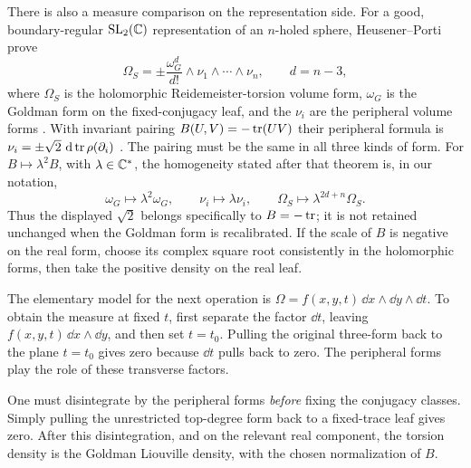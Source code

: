 There is also a measure comparison on the representation side.
For a good, boundary-regular $\mathrm{SL}_2(\mathbb C)$ representation
of an $n$-holed sphere, Heusener--Porti prove
\begin{equation}
 \Omega_S=\pm\frac{\omega_G^d}{d!}
                  \wedge\nu_1\wedge\cdots\wedge\nu_n,
                  \qquad d=n-3,
 \label{eq:torsionGoldman}
\end{equation}
where $\Omega_S$ is the holomorphic Reidemeister-torsion volume
form, $\omega_G$ is the Goldman form on the fixed-conjugacy
leaf, and the $\nu_i$ are the peripheral volume forms
\cite[Theorem~3]{HeusenerPorti}. With invariant pairing
$B(U,V)=-\operatorname{tr}(UV)$ their peripheral formula is
$\nu_i=\pm\sqrt2\,\mathop{}\!\mathrm d\operatorname{tr}\rho(\partial_i)$
\cite[Proposition~2]{HeusenerPorti}.
The pairing must be the same in all three kinds of form.
For $B\mapsto\lambda^2B$, with $\lambda\in\mathbb C^*$,
the homogeneity stated after that theorem is, in our notation,
\[
 \omega_G\mapsto\lambda^2\omega_G,\qquad
 \nu_i\mapsto\lambda\nu_i,\qquad
 \Omega_S\mapsto\lambda^{2d+n}\Omega_S.
\]
Thus the displayed $\sqrt2$ belongs specifically to $B=-\operatorname{tr}$;
it is not retained unchanged when the Goldman form is recalibrated.
If the scale of $B$ is negative on the real form, choose its
complex square root consistently in the holomorphic forms,
then take the positive density on the real leaf.

The elementary model for the next operation is
$\Omega=f(x,y,t)\,\dd x\wedge\dd y\wedge\dd t$.
To obtain the measure at fixed $t$, first separate the factor
$\dd t$, leaving $f(x,y,t)\,\dd x\wedge\dd y$, and then
set $t=t_0$. Pulling the original three-form back to the
plane $t=t_0$ gives zero because $\dd t$ pulls back to zero.
The peripheral forms play the role of these transverse factors.

One must disintegrate by the peripheral forms \emph{before}
fixing the conjugacy classes. Simply pulling the unrestricted
top-degree form back to a fixed-trace leaf gives zero. After
this disintegration, and on the relevant real component, the
torsion density is the Goldman Liouville density, with the
chosen normalization of $B$.

